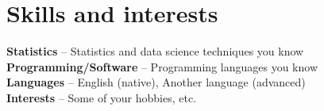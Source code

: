 \documentclass[letterpaper, 12pt]{article}
\begin{document}

\section*{Skills and interests}

\begin{addmargin}[1em]{0em}

\textbf{Statistics} -- Statistics and data science techniques you know\\
\textbf{Programming/Software} -- Programming languages you know \\
\textbf{Languages} -- English (native), Another language (advanced) \\
\textbf{Interests} -- Some of your hobbies, etc.

\end{addmargin}

	
\end{document}
